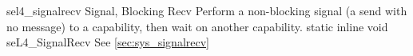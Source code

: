 %
%
%
%

\apidoc
{sel4_signalrecv}
{Signal, Blocking Recv}
{Perform a non-blocking signal (a send with no message) to a capability, then wait on another capability.}
{static inline void seL4\_SignalRecv}
{
}
{\noret}
{See \autoref{sec:sys_signalrecv}}
